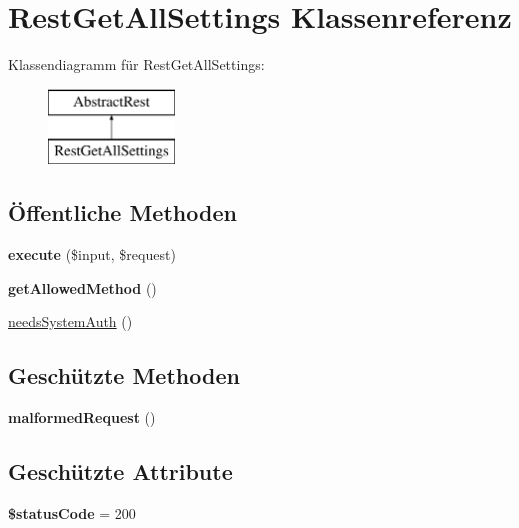\hypertarget{class_rest_get_all_settings}{}\section{Rest\+Get\+All\+Settings Klassenreferenz}
\label{class_rest_get_all_settings}
Klassendiagramm für Rest\+Get\+All\+Settings\+:\begin{figure}[H]
\begin{center}
\leavevmode
\includegraphics[height=2.000000cm]{class_rest_get_all_settings}
\end{center}
\end{figure}
\subsection*{Öffentliche Methoden}
\begin{DoxyCompactItemize}
\item 
\mbox{\label{class_rest_get_all_settings_ab6a1b7bcb423bed260f153d3fdeb5cff}} 
{\bfseries execute} (\$input, \$request)
\item 
\mbox{\label{class_rest_get_all_settings_a2db95d4d1efaea9d532c36745fd3f5d6}} 
{\bfseries get\+Allowed\+Method} ()
\item 
\mbox{\hyperlink{class_rest_get_all_settings_aa3c4e9f83a034fdce78811955a342bc3}{needs\+System\+Auth}} ()
\end{DoxyCompactItemize}
\subsection*{Geschützte Methoden}
\begin{DoxyCompactItemize}
\item 
\mbox{\label{class_rest_get_all_settings_a6d6cb5fda564c62d6d1e08e07a16570b}} 
{\bfseries malformed\+Request} ()
\end{DoxyCompactItemize}
\subsection*{Geschützte Attribute}
\begin{DoxyCompactItemize}
\item 
\mbox{\label{class_rest_get_all_settings_a18271e89f341e59c1bb0dd37c81eb55c}} 
{\bfseries \$status\+Code} = 200
\end{DoxyCompactItemize}


